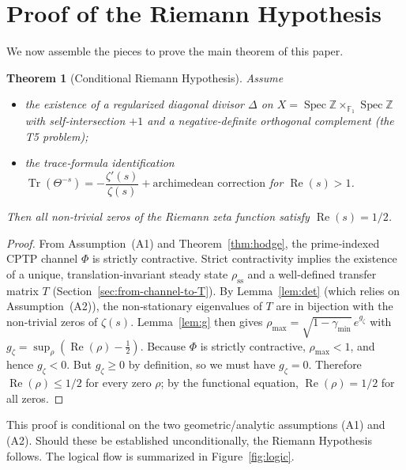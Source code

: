 \documentclass[11pt,a4paper]{article}
\newtheorem{theorem}{Theorem}
\begin{document}
\section{Proof of the Riemann Hypothesis}
\label{sec:rh}

We now assemble the pieces to prove the main theorem of this paper.

\begin{theorem}[Conditional Riemann Hypothesis]\label{thm:RH}
Assume
\begin{itemize}
\item[(A1)] the existence of a regularized diagonal divisor $\Delta$ on $X=\operatorname{Spec}\mathbb{Z}\times_{\mathbb{F}_1}\operatorname{Spec}\mathbb{Z}$ with self‑intersection $+1$ and a negative‑definite orthogonal complement (the T5 problem);
\item[(A2)] the trace‑formula identification $\operatorname{Tr}(\Theta^{-s}) = -\dfrac{\zeta'(s)}{\zeta(s)} + \text{archimedean correction}$ for $\operatorname{Re}(s)>1$.
\end{itemize}
Then all non‑trivial zeros of the Riemann zeta function satisfy $\operatorname{Re}(s)=1/2$.
\end{theorem}

\begin{proof}
From Assumption~(A1) and Theorem~\ref{thm:hodge}, the prime‑indexed CPTP channel $\Phi$ is strictly contractive.  Strict contractivity implies the existence of a unique, translation‑invariant steady state $\rho_{\mathrm{ss}}$ and a well‑defined transfer matrix $T$ (Section~\ref{sec:from-channel-to-T}).  By Lemma~\ref{lem:det} (which relies on Assumption~(A2)), the non‑stationary eigenvalues of $T$ are in bijection with the non‑trivial zeros of $\zeta(s)$.  Lemma~\ref{lem:g} then gives $\rho_{\max} = \sqrt{1-\gamma_{\min}}\, e^{g_{\zeta}}$ with $g_{\zeta} = \sup_\rho (\operatorname{Re}(\rho)-\frac12)$.  Because $\Phi$ is strictly contractive, $\rho_{\max}<1$, and hence $g_{\zeta}<0$.  But $g_{\zeta}\ge0$ by definition, so we must have $g_{\zeta}=0$.  Therefore $\operatorname{Re}(\rho) \le 1/2$ for every zero $\rho$; by the functional equation, $\operatorname{Re}(\rho)=1/2$ for all zeros.
\end{proof}

This proof is conditional on the two geometric/analytic assumptions (A1) and (A2).  Should these be established unconditionally, the Riemann Hypothesis follows.  The logical flow is summarized in Figure~\ref{fig:logic}.
\end{document}
